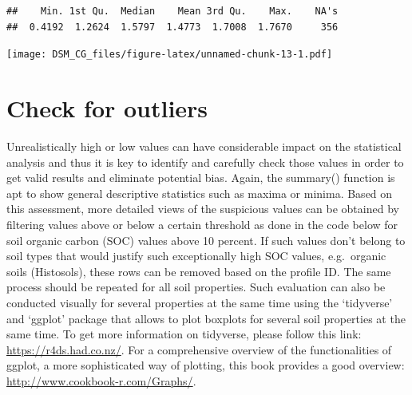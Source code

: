 \documentclass[
  10pt,
  b5paper,
  oneside]{book}
\newenvironment{Shaded}{\begin{snugshade}}{\end{snugshade}}
\newcommand{\AttributeTok}[1]{\textcolor[rgb]{0.77,0.63,0.00}{#1}}
\newcommand{\ConstantTok}[1]{\textcolor[rgb]{0.00,0.00,0.00}{#1}}
\newcommand{\DecValTok}[1]{\textcolor[rgb]{0.00,0.00,0.81}{#1}}
\newcommand{\FloatTok}[1]{\textcolor[rgb]{0.00,0.00,0.81}{#1}}
\newcommand{\FunctionTok}[1]{\textcolor[rgb]{0.00,0.00,0.00}{#1}}
\newcommand{\NormalTok}[1]{#1}
\newcommand{\SpecialCharTok}[1]{\textcolor[rgb]{0.00,0.00,0.00}{#1}}
\newcommand{\StringTok}[1]{\textcolor[rgb]{0.31,0.60,0.02}{#1}}
\begin{document}
\begin{verbatim}
##    Min. 1st Qu.  Median    Mean 3rd Qu.    Max.    NA's 
##  0.4192  1.2624  1.5797  1.4773  1.7008  1.7670     356
\end{verbatim}

\begin{Shaded}
\end{Shaded}

\texttt{[image: DSM\_CG\_files/figure-latex/unnamed-chunk-13-1.pdf]}

\hypertarget{check-for-outliers}{%
\section{Check for outliers}\label{check-for-outliers}}

Unrealistically high or low values can have considerable impact on the statistical analysis and thus it is key to identify and carefully check those values in order to get valid results and eliminate potential bias. Again, the summary() function is apt to show general descriptive statistics such as maxima or minima. Based on this assessment, more detailed views of the suspicious values can be obtained by filtering values above or below a certain threshold as done in the code below for soil organic carbon (SOC) values above 10 percent. If such values don't belong to soil types that would justify such exceptionally high SOC values, e.g.~organic soils (Histosols), these rows can be removed based on the profile ID. The same process should be repeated for all soil properties.
Such evaluation can also be conducted visually for several properties at the same time using the `tidyverse' and `ggplot' package that allows to plot boxplots for several soil properties at the same time. To get more information on tidyverse, please follow this link: \url{https://r4ds.had.co.nz/}. For a comprehensive overview of the functionalities of ggplot, a more sophisticated way of plotting, this book provides a good overview: \url{http://www.cookbook-r.com/Graphs/}.
\end{document}
